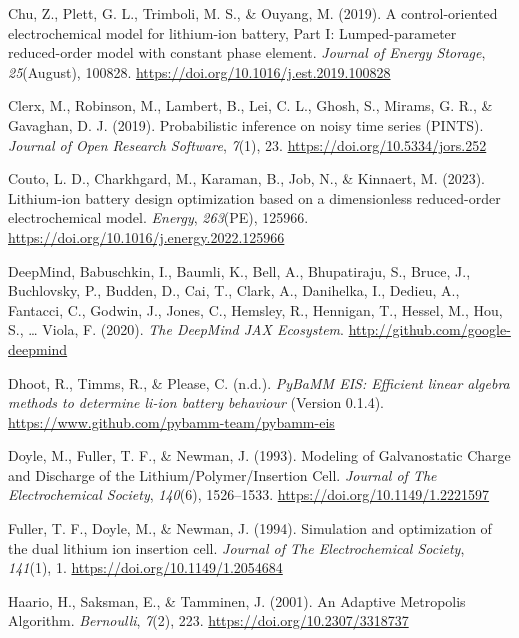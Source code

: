 \documentclass[
]{article}
\newlength{\cslhangindent}
\newenvironment{CSLReferences}[2] %
 {\begin{list}{}{%
  \setlength{\itemindent}{0pt}
  \setlength{\leftmargin}{0pt}
  \setlength{\parsep}{0pt}
  \ifodd #1
   \setlength{\leftmargin}{\cslhangindent}
   \setlength{\itemindent}{-1\cslhangindent}
  \fi
  \setlength{\itemsep}{#2\baselineskip}}}
 {\end{list}}
\begin{document}
\begin{CSLReferences}{1}{0}
Chu, Z., Plett, G. L., Trimboli, M. S., \& Ouyang, M. (2019). A
control-oriented electrochemical model for lithium-ion battery, {P}art
{I}: {L}umped-parameter reduced-order model with constant phase element.
\emph{Journal of Energy Storage}, \emph{25}(August), 100828.
\url{https://doi.org/10.1016/j.est.2019.100828}

Clerx, M., Robinson, M., Lambert, B., Lei, C. L., Ghosh, S., Mirams, G.
R., \& Gavaghan, D. J. (2019). Probabilistic inference on noisy time
series ({PINTS}). \emph{Journal of Open Research Software}, \emph{7}(1),
23. \url{https://doi.org/10.5334/jors.252}

Couto, L. D., Charkhgard, M., Karaman, B., Job, N., \& Kinnaert, M.
(2023). Lithium-ion battery design optimization based on a dimensionless
reduced-order electrochemical model. \emph{Energy}, \emph{263}(PE),
125966. \url{https://doi.org/10.1016/j.energy.2022.125966}

DeepMind, Babuschkin, I., Baumli, K., Bell, A., Bhupatiraju, S., Bruce,
J., Buchlovsky, P., Budden, D., Cai, T., Clark, A., Danihelka, I.,
Dedieu, A., Fantacci, C., Godwin, J., Jones, C., Hemsley, R., Hennigan,
T., Hessel, M., Hou, S., \ldots{} Viola, F. (2020). \emph{The
{D}eep{M}ind {JAX} {E}cosystem}. \url{http://github.com/google-deepmind}

Dhoot, R., Timms, R., \& Please, C. (n.d.). \emph{PyBaMM EIS: Efficient
linear algebra methods to determine li-ion battery behaviour} (Version
0.1.4). \url{https://www.github.com/pybamm-team/pybamm-eis}

Doyle, M., Fuller, T. F., \& Newman, J. (1993). {Modeling of
Galvanostatic Charge and Discharge of the Lithium/Polymer/Insertion
Cell}. \emph{Journal of The Electrochemical Society}, \emph{140}(6),
1526--1533. \url{https://doi.org/10.1149/1.2221597}

Fuller, T. F., Doyle, M., \& Newman, J. (1994). Simulation and
optimization of the dual lithium ion insertion cell. \emph{Journal of
The Electrochemical Society}, \emph{141}(1), 1.
\url{https://doi.org/10.1149/1.2054684}

Haario, H., Saksman, E., \& Tamminen, J. (2001). An {Adaptive}
{Metropolis} {Algorithm}. \emph{Bernoulli}, \emph{7}(2), 223.
\url{https://doi.org/10.2307/3318737}


\end{CSLReferences}
\end{document}
